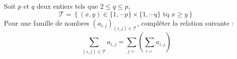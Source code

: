 Soit $p$ et $q$ deux entiers tels que $2\leq q \leq p$,
\begin{displaymath}
 \mathcal T = \left\lbrace (x,y)\in \{1,\cdots p\}\times\{1,\cdots q\}\text{ tq } x\geq y \right\rbrace 
\end{displaymath}
Pour une famille de nombres $(a_{i,j})_{(i,j)\in \mathcal T}$, compl\'eter la relation suivante :
\begin{displaymath}
  \sum_{(i,j)\in \mathcal T}a_{i,j}=\sum_{j=}\left( \sum_{i=} a_{i,j}\right)
\end{displaymath}
